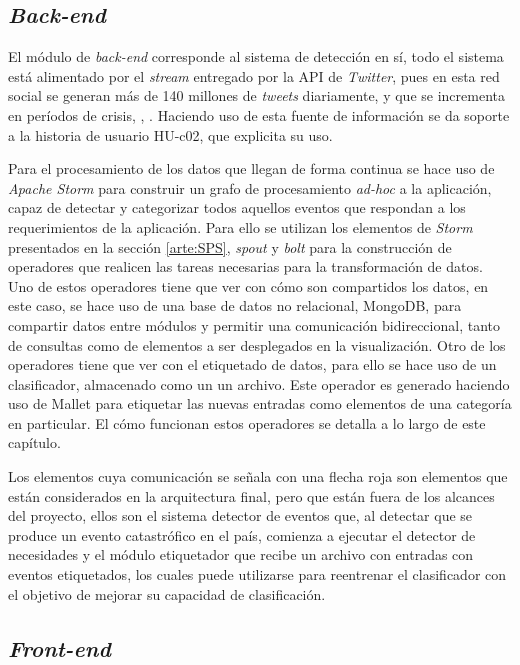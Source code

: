 \subsection{\textit{Back-end}}
\label{subsec:backend}

El módulo de \textit{back-end} corresponde al sistema de detección en sí, todo el sistema está alimentado por el \textit{stream} entregado por la API de \textit{Twitter}, pues en esta red social se generan más de 140 millones de \textit{tweets} diariamente, y que se incrementa en períodos de crisis, \citep{TaxonomiaChato}, \citep{StormIBM}. Haciendo uso de esta fuente de información se da soporte a la historia de usuario HU-c02, que explicita su uso.

Para el procesamiento de los datos que llegan de forma continua se hace uso de \textit{Apache Storm} para construir un grafo de procesamiento \textit{ad-hoc} a la aplicación, capaz de detectar y categorizar todos aquellos eventos que respondan a los requerimientos de la aplicación. Para ello se utilizan los elementos de \textit{Storm} presentados en la sección \ref{arte:SPS}, \textit{spout} y \textit{bolt} para la construcción de operadores que realicen las tareas necesarias para la transformación de datos. Uno de estos operadores tiene que ver con cómo son compartidos los datos, en este caso, se hace uso de una base de datos no relacional, MongoDB, para compartir datos entre módulos y permitir una comunicación bidireccional, tanto de consultas como de elementos a ser desplegados en la visualización. Otro de los operadores tiene que ver con el etiquetado de datos, para ello se hace uso de un clasificador, almacenado como un un archivo. Este operador es generado haciendo uso de Mallet para etiquetar las nuevas entradas como elementos de una categoría en particular. El cómo funcionan estos operadores se detalla a lo largo de este capítulo.

Los elementos cuya comunicación se señala con una flecha roja son elementos que están considerados en la arquitectura final, pero que están fuera de los alcances del proyecto, ellos son el sistema detector de eventos que, al detectar que se produce un evento catastrófico en el país, comienza a ejecutar el detector de necesidades y el módulo etiquetador que recibe un archivo con entradas con eventos etiquetados, los cuales puede utilizarse para reentrenar el clasificador con el objetivo de mejorar su capacidad de clasificación.

\subsection{\textit{Front-end}}
\label{subsec:front}

